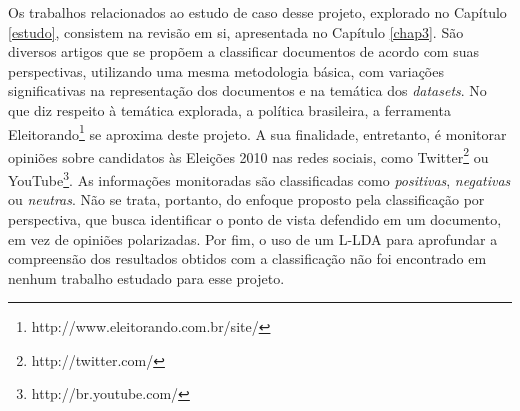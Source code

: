 Os trabalhos relacionados ao estudo de caso desse projeto, explorado no Capítulo \ref{estudo}, consistem na revisão em si, apresentada no Capítulo \ref{chap3}. São diversos artigos que se propõem a classificar documentos de acordo com suas perspectivas, utilizando uma mesma metodologia básica, com variações significativas na representação dos documentos e na temática dos \emph{datasets}. No que diz respeito à temática explorada, a política brasileira, a ferramenta Eleitorando\footnote{http://www.eleitorando.com.br/site/} se aproxima deste projeto. A sua finalidade, entretanto, é monitorar opiniões sobre candidatos às Eleições 2010 nas redes sociais, como Twitter\footnote{http://twitter.com/} ou YouTube\footnote{http://br.youtube.com/}. As informações monitoradas são classificadas como \emph{positivas}, \emph{negativas} ou \emph{neutras}. Não se trata, portanto, do enfoque proposto pela classificação por perspectiva, que busca identificar o ponto de vista defendido em um documento, em vez de opiniões polarizadas. Por fim, o uso de um L-LDA para aprofundar a compreensão dos resultados obtidos com a classificação não foi encontrado em nenhum trabalho estudado para esse projeto.     
